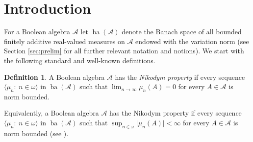 \documentclass[a4paper,11pt,fleqn]{amsart}
\theoremstyle{definition}
\newtheorem{definition}[theorem]{Definition}
\theoremstyle{remark}
\numberwithin{equation}{section}
\newcommand{\N}{\mathbb{N}}
\newcommand{\aA}{\mathcal{A}}
\DeclareMathOperator{\ba}{ba}
\newcommand{\seqn}[1]{\big\langle#1\colon\ n\io\big\rangle}
\newcommand{\io}{\in\omega}%
\begin{document}



\maketitle

\section{Introduction\label{sec:intro}}


For a Boolean algebra $\aA$ let $\ba(\aA)$ denote the Banach space of all bounded finitely additive real-valued measures on $\aA$ endowed with the variation norm (see Section \ref{sec:prelim} for all further relevant notation and notions). We start with the following standard and well-known definitions.

\begin{definition}\label{def:nikodym}
A Boolean algebra $\aA$ has the \textit{Nikodym property} if every sequence $\seqn{\mu_n}$ in $\ba(\aA)$ such that $\lim_{n\to\infty}\mu_n(A)=0$ for every $A\in\aA$ is norm bounded.
\end{definition}

Equivalently, a Boolean algebra $\aA$ has the Nikodym property if every sequence $\seqn{\mu_n}$ in $\ba(\aA)$ such that $\sup_{n\io}\big|\mu_n(A)\big|<\infty$ for every $A\in\aA$ is norm bounded (see \cite[Proposition 2.4]{SZ19}).
\end{document}
